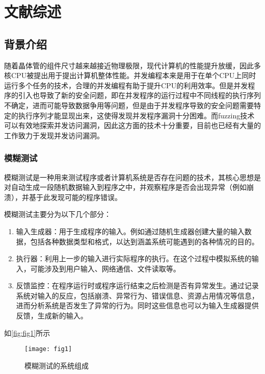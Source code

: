 \cleardoublepage
\newrefsection
\chapter{文献综述}

\section{背景介绍}

随着晶体管的组件尺寸越来越接近物理极限，现代计算机的性能提升放缓，因此多核CPU被提出用于提出计算机整体性能。并发编程本来是用于在单个CPU上同时运行多个任务的技术，合理的并发编程有助于提升CPU的利用效率。但是并发程序的引入也导致了新的安全问题，即在并发程序的运行过程中不同线程的执行序列不确定，进而可能导致数据争用等问题，但是由于并发程序导致的安全问题需要特定的执行序列才能显现出来，这使得发现并发程序漏洞十分困难。而fuzzing技术可以有效地探索并发访问漏洞，因此这方面的技术十分重要，目前也已经有大量的工作致力于发现并发访问漏洞。

\subsection{模糊测试}

模糊测试是一种用来测试程序或者计算机系统是否存在问题的技术，其核心思想是对自动生成一段随机数据输入到程序之中，并观察程序是否会出现异常（例如崩溃），并基于此发现可能的程序错误。

模糊测试主要分为以下几个部分：
\begin{enumerate}
\item 输入生成器：用于生成程序的输入。例如通过随机生成器创建大量的输入数据，包括各种数据类型和格式，以达到涵盖系统可能遇到的各种情况的目的。
\item 执行器：利用上一步的输入进行实际程序的执行。在这个过程中模拟系统的输入，可能涉及到用户输入、网络通信、文件读取等。
\item 反馈监控：在程序运行时或程序运行结束之后检测是否有异常发生。通过记录系统对输入的反应，包括崩溃、异常行为、错误信息、资源占用情况等信息，进而分析系统是否发生了异常的行为。同时这些信息也可以为输入生成器提供反馈，生成新的输入。
\end{enumerate}

如\autoref{fig:fig1}所示

\begin{figure}[ht]
    \centering
    \texttt{[image: fig1]}
    \caption{\label{fig:fig1}模糊测试的系统组成}
\end{figure}

